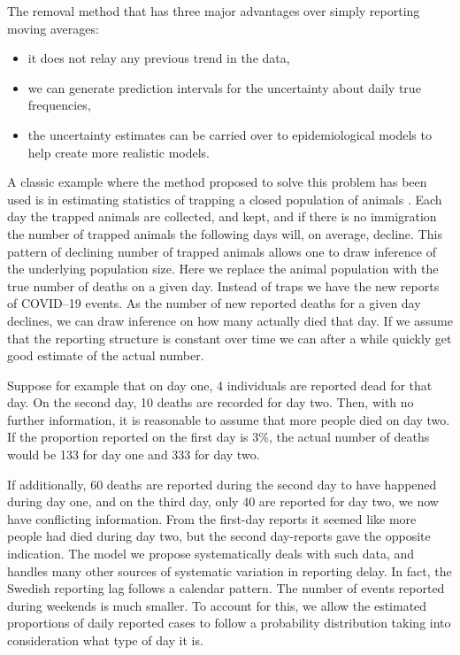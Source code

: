 \documentclass[a4paper,11pth]{article}
\begin{document}
The removal method that has three major advantages over simply reporting moving averages:

\begin{itemize}
	\item it does not relay any previous trend in the data,
	\item we can generate prediction intervals for the uncertainty about daily true frequencies,
	\item the uncertainty estimates can be carried over to epidemiological models to help create more realistic models.
\end{itemize}

A classic example where the method proposed to solve this problem has been used is in estimating statistics of trapping a closed population of animals \citep{Pollock1991_review_papers}. Each day the trapped animals are collected, and kept, and if there is no immigration the number of trapped animals the following days will, on average, decline. This pattern of declining number of trapped animals allows one to draw inference of the underlying population size. Here we replace the animal population with the true number of deaths
on a given day. Instead of traps we have the new reports of COVID--19 events. As the number of new reported deaths for a given day declines, we can draw inference on how many actually died that day. If we assume that the reporting structure is constant over time we can after a while quickly get good estimate of the actual number.

Suppose for example that on day one, 4 individuals are reported dead for that day. On the second day, 10 deaths are recorded for day two. Then, with no further information, it is reasonable to assume that more people died on day two. If the proportion reported on the first day is 3\%, the actual number of deaths would be 133 for day one and 333 for day two.

If additionally, 60 deaths are reported during the second day to have happened during day one, and on the third day, only 40 are reported for day two, we now have conflicting information. From the first-day reports it seemed like more people had died during day two, but the second day-reports gave the opposite indication. The model we propose systematically deals with such data, and handles many other sources of systematic variation in reporting delay. In fact, the Swedish reporting lag follows a calendar pattern. The number of events reported during weekends is much smaller. To account for this, we allow the estimated proportions of daily reported cases to follow a probability distribution taking into consideration what type of day it is.
\end{document}
